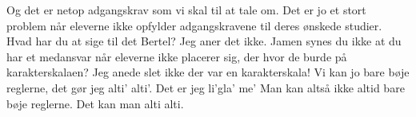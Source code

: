 \documentclass[a4paper,11pt]{article}
\begin{document}
\begin{sketch}
 Og det er netop adgangskrav som vi skal til at tale om.
 Det er jo et stort problem når eleverne ikke opfylder adgangskravene til deres ønskede studier.  Hvad har du at sige til det Bertel?
 Jeg aner det ikke.
 Jamen synes du ikke at du har et medansvar når eleverne ikke placerer sig, der hvor de burde på karakterskalaen?
 Jeg anede slet ikke der var en karakterskala!
 Vi kan jo bare bøje reglerne, det gør jeg alti' alti'. Det er jeg li'gla' me'
 Man kan altså ikke altid bare bøje reglerne.
 Det kan man alti alti.

\end{sketch}
\end{document}
